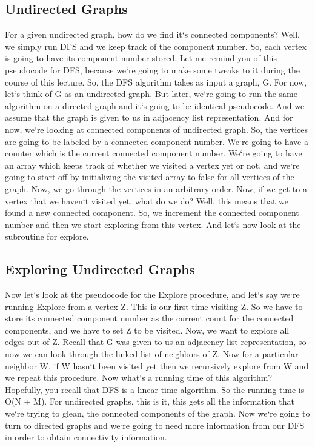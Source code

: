 \subsection{Undirected Graphs}
For a given undirected graph, how do we find it`s connected components? Well, we simply run DFS and we keep track of the component number.
So, each vertex is going to have its component number stored.
Let me remind you of this pseudocode for DFS, because we`re going to make some tweaks to it during the course of this lecture.
So, the DFS algorithm takes as input a graph, G\@.
For now, let`s think of G as an undirected graph.
But later, we`re going to run the same algorithm on a directed graph and it`s going to be identical pseudocode.
And we assume that the graph is given to us in adjacency list representation.
And for now, we`re looking at connected components of undirected graph.
So, the vertices are going to be labeled by a connected component number.
We`re going to have a counter which is the current connected component number.
We`re going to have an array which keeps track of whether we visited a vertex yet or not, and we`re going to start off by initializing the visited array to false for all vertices of the graph.
Now, we go through the vertices in an arbitrary order.
Now, if we get to a vertex that we haven`t visited yet, what do we do? Well, this means that we found a new connected component.
So, we increment the connected component number and then we start exploring from this vertex.
And let`s now look at the subroutine for explore.

\subsection{Exploring Undirected Graphs}
Now let`s look at the pseudocode for the Explore procedure, and let`s say we`re running Explore from a vertex Z\@.
This is our first time visiting Z\@.
So we have to store its connected component number as the current count for the connected components, and we have to set Z to be visited.
Now, we want to explore all edges out of Z\@.
Recall that G was given to us an adjacency list representation, so now we can look through the linked list of neighbors of Z\@.
Now for a particular neighbor W, if W hasn`t been visited yet then we recursively explore from W and we repeat this procedure.
Now what`s a running time of this algorithm? Hopefully, you recall that DFS is a linear time algorithm.
So the running time is O(N + M).
For undirected graphs, this is it, this gets all the information that we`re trying to glean, the connected components of the graph.
Now we`re going to turn to directed graphs and we`re going to need more information from our DFS in order to obtain connectivity information.

